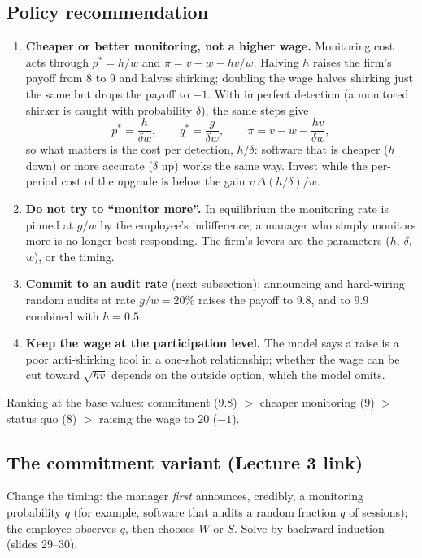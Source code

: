 \documentclass[11pt,a4paper]{article}
\begin{document}
\subsection*{Policy recommendation}

\begin{enumerate}[label=\arabic*.]
  \item \textbf{Cheaper or better monitoring, not a higher wage.} Monitoring cost acts through
        $p^* = h/w$ and $\pi = v - w - hv/w$. Halving $h$ raises the firm's payoff from 8 to 9 and
        halves shirking; doubling the wage halves shirking just the same but drops the payoff to
        $-1$. With imperfect detection (a monitored shirker is caught with probability $\delta$), the
        same steps give
        \[
          p^* = \frac{h}{\delta w}, \qquad q^* = \frac{g}{\delta w}, \qquad
          \pi = v - w - \frac{h v}{\delta w},
        \]
        so what matters is the cost per detection, $h/\delta$: software that is cheaper ($h$ down) or
        more accurate ($\delta$ up) works the same way. Invest while the per-period cost of the
        upgrade is below the gain $v\,\Delta(h/\delta)/w$.
  \item \textbf{Do not try to ``monitor more''.} In equilibrium the monitoring rate is pinned at
        $g/w$ by the employee's indifference; a manager who simply monitors more is no longer best
        responding. The firm's levers are the parameters ($h$, $\delta$, $w$), or the timing.
  \item \textbf{Commit to an audit rate} (next subsection): announcing and hard-wiring random audits
        at rate $g/w = 20\%$ raises the payoff to $9.8$, and to $9.9$ combined with $h = 0.5$.
  \item \textbf{Keep the wage at the participation level.} The model says a raise is a poor
        anti-shirking tool in a one-shot relationship; whether the wage can be cut toward
        $\sqrt{hv}$ depends on the outside option, which the model omits.
\end{enumerate}
Ranking at the base values: commitment (9.8) $>$ cheaper monitoring (9) $>$ status quo (8) $>$
raising the wage to 20 ($-1$).

\subsection*{The commitment variant (Lecture 3 link)}

Change the timing: the manager \emph{first} announces, credibly, a monitoring probability $q$ (for
example, software that audits a random fraction $q$ of sessions); the employee observes $q$, then
chooses $W$ or $S$. Solve by backward induction (slides 29--30).
\end{document}
